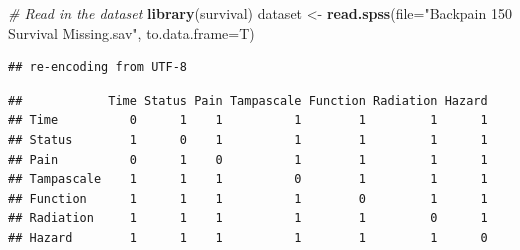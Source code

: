 \documentclass[
]{book}
\newenvironment{Shaded}{\begin{snugshade}}{\end{snugshade}}
\newcommand{\CommentTok}[1]{\textcolor[rgb]{0.56,0.35,0.01}{\textit{#1}}}
\newcommand{\DataTypeTok}[1]{\textcolor[rgb]{0.13,0.29,0.53}{#1}}
\newcommand{\DecValTok}[1]{\textcolor[rgb]{0.00,0.00,0.81}{#1}}
\newcommand{\KeywordTok}[1]{\textcolor[rgb]{0.13,0.29,0.53}{\textbf{#1}}}
\newcommand{\NormalTok}[1]{#1}
\newcommand{\OperatorTok}[1]{\textcolor[rgb]{0.81,0.36,0.00}{\textbf{#1}}}
\newcommand{\StringTok}[1]{\textcolor[rgb]{0.31,0.60,0.02}{#1}}
\begin{document}
\begin{Shaded}
\begin{Highlighting}[]
\CommentTok{# Read in the dataset}
\KeywordTok{library}\NormalTok{(survival)}
\NormalTok{dataset <-}\StringTok{ }\KeywordTok{read.spss}\NormalTok{(}\DataTypeTok{file=}\StringTok{"Backpain 150 Survival Missing.sav"}\NormalTok{, }\DataTypeTok{to.data.frame=}\NormalTok{T)}
\end{Highlighting}
\end{Shaded}

\begin{verbatim}
## re-encoding from UTF-8
\end{verbatim}

\begin{Shaded}
\end{Shaded}

\begin{verbatim}
##            Time Status Pain Tampascale Function Radiation Hazard
## Time          0      1    1          1        1         1      1
## Status        1      0    1          1        1         1      1
## Pain          0      1    0          1        1         1      1
## Tampascale    1      1    1          0        1         1      1
## Function      1      1    1          1        0         1      1
## Radiation     1      1    1          1        1         0      1
## Hazard        1      1    1          1        1         1      0
\end{verbatim}
\end{document}
